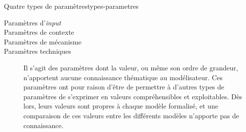 \begin{encadre}{Quatre types de paramètres}{types-parametres}
\renewcommand{\thempfootnote}{\alph{mpfootnote}}
	\begin{description}
		\item[Paramètres d'\textit{input}]
		
		\item[Paramètres de contexte]
		
		\item[Paramètres de mécanisme]
		
		\item[Paramètres techniques] Il s'agit des paramètres dont la valeur, ou même son ordre de grandeur, n'apportent aucune connaissance thématique au modélisateur.
		Ces paramètres ont pour raison d'être de permettre à d'autres types de paramètres de s'exprimer en valeurs compréhensibles et exploitables.
		Dès lors, leurs valeurs sont propres à chaque modèle formalisé, et une comparaison de ces valeurs entre les différents modèles n'apporte pas de connaissance.
%		
		

\end{description}
\end{encadre}

